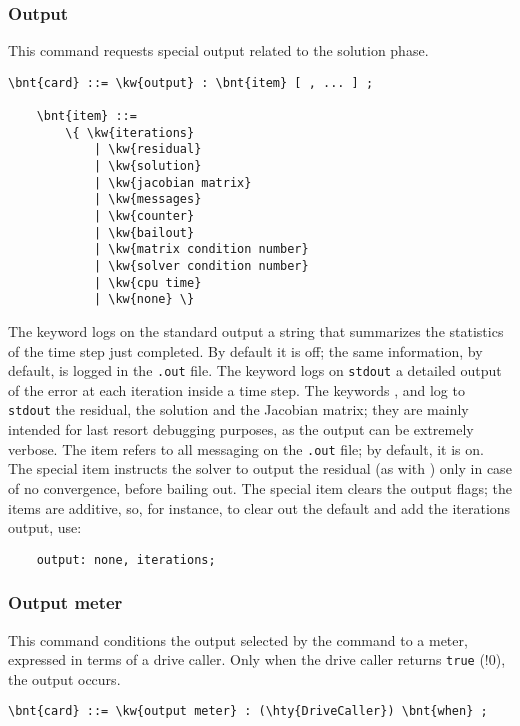 \subsubsection{Output}
This command requests special output related to the solution phase.
\begin{Verbatim}[commandchars=\\\{\}]
    \bnt{card} ::= \kw{output} : \bnt{item} [ , ... ] ;

    \bnt{item} ::=
        \{ \kw{iterations}
            | \kw{residual}
            | \kw{solution}
            | \kw{jacobian matrix}
            | \kw{messages}
            | \kw{counter}
            | \kw{bailout}
            | \kw{matrix condition number}
            | \kw{solver condition number}
            | \kw{cpu time}
            | \kw{none} \}
\end{Verbatim}
The keyword  logs on the standard output a string
that summarizes the statistics of the time step just completed.
By default it is off; the same information, by default,
is logged in the \texttt{.out} file.
The keyword  logs on \texttt{stdout}
a detailed output of the error at each iteration inside a time step.
The keywords ,  and 
log to \texttt{stdout} the residual, the solution and the Jacobian matrix;
they are mainly intended for last resort debugging purposes,
as the output can be extremely verbose.
The item  refers to all messaging on the \texttt{.out} file;
by default, it is on.
The special item  instructs the solver to output the residual
(as with ) only in case of no convergence, before bailing out.
The special item  clears the output flags; the items
are additive, so, for instance, to clear out the default 
and add the iterations output, use:
\begin{verbatim}
    output: none, iterations;
\end{verbatim}

\subsubsection{Output meter}
This command conditions the output selected by the  command
to a meter, expressed in terms of a drive caller.
Only when the drive caller returns \texttt{true} (!0), the output occurs.
\begin{Verbatim}[commandchars=\\\{\}]
    \bnt{card} ::= \kw{output meter} : (\hty{DriveCaller}) \bnt{when} ;
\end{Verbatim}



